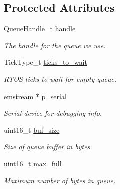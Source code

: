 \subsection*{Protected Attributes}
\begin{DoxyCompactItemize}
\item 
\mbox{\label{class_task_queue_a9e2438ecd0f75063540296b04f3b511e}} 
Queue\+Handle\+\_\+t \mbox{\hyperlink{class_task_queue_a9e2438ecd0f75063540296b04f3b511e}{handle}}
\begin{DoxyCompactList}\small\item\em The handle for the queue we use. \end{DoxyCompactList}\item 
\mbox{\label{class_task_queue_ad969b6d7fe091778283bc8cc1b6792bd}} 
Tick\+Type\+\_\+t \mbox{\hyperlink{class_task_queue_ad969b6d7fe091778283bc8cc1b6792bd}{ticks\+\_\+to\+\_\+wait}}
\begin{DoxyCompactList}\small\item\em R\+T\+OS ticks to wait for empty queue. \end{DoxyCompactList}\item 
\mbox{\label{class_task_queue_a8b168989633f215a8f1c8b4a399b8782}} 
\mbox{\hyperlink{classemstream}{emstream}} $\ast$ \mbox{\hyperlink{class_task_queue_a8b168989633f215a8f1c8b4a399b8782}{p\+\_\+serial}}
\begin{DoxyCompactList}\small\item\em Serial device for debugging info. \end{DoxyCompactList}\item 
\mbox{\label{class_task_queue_af4c4635ceb7cd5f0f331301285b5c211}} 
uint16\+\_\+t \mbox{\hyperlink{class_task_queue_af4c4635ceb7cd5f0f331301285b5c211}{buf\+\_\+size}}
\begin{DoxyCompactList}\small\item\em Size of queue buffer in bytes. \end{DoxyCompactList}\item 
\mbox{\label{class_task_queue_a93a34bc4223badccc7ca6afd6b16ec99}} 
uint16\+\_\+t \mbox{\hyperlink{class_task_queue_a93a34bc4223badccc7ca6afd6b16ec99}{max\+\_\+full}}
\begin{DoxyCompactList}\small\item\em Maximum number of bytes in queue. \end{DoxyCompactList}\end{DoxyCompactItemize}
